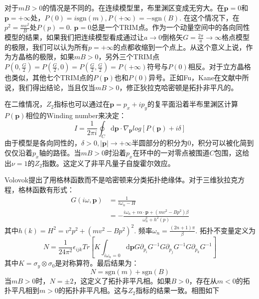 \documentclass{article}
\numberwithin{equation}{subsection}
\newcommand{\p}{\mathbf{p}}
\newcommand{\md}{\mathrm{d}}
\begin{document}
对于$mB>0$的情况是不同的。在连续模型里，布里渊区变成无穷大。在$\p=0$和$\p=+\infty$处，$P(0)=i\mathrm{sgn}(m),P(+\infty)=-\mathrm{sgn}(B)$. 在这个情况下，在$p^2=\frac{mv^2}{B}$处$P(p)=0$. $\p=0$总是一个TRIM点。作为一个动量空间中的各向同性模型的结果，如果我们把连续模型看成通过让$a\to0$倒格矢$G=\frac{2\pi}{a}\to\infty$格点模型的极限，我们可以认为所有$p=+\infty$的点都收缩到一个点上。从这个意义上说，作为方晶格的极限，如果$mB>0$，另外三个TRIM点$P(0,\frac{G}{2})=P(\frac{G}{2},0)=P(\frac{G}{2},\frac{G}{2})=P(+\infty)$符号与$P(0)$相反。对于立方晶格也类似，其他七个TRIM点的$P(\p)$也和$P(0)$异号。正如Fu，Kane在文献中所说，我们得出结论，当且仅当$mB>0$，修正狄拉克哈密顿是拓扑非平凡的。

在二维情况，$Z_2$指标也可以通过在$\p=p_x+ip_y$的复平面沿着半布里渊区计算$P(\p)$相位的Winding number来决定：
\begin{equation}
    I=\frac{1}{2\pi i}\oint_C\md\p\cdot\nabla_{\p}log[P(\p)+i\delta]
\end{equation}
由于模型是各向同性的，$\delta>0,|\p|\to+\infty$半圆部分的积分为$0$，积分可以被化简到仅仅沿着$p_x$轴的路径。当$mB>0$时沿着$p_x$在环中的一对零点被围道$C$包围，这给出$\nu=1$的$Z_2$指数。这定义了非平凡量子自旋霍尔效应。

Volovok提出了用格林函数而不是哈密顿来分类拓扑绝缘体。对于三维狄拉克方程，格林函数有形式：
\begin{equation}
    \begin{split}
        G(i\omega,\p)&=\frac{1}{i\omega_n-H}\\
        &=-\frac{i\omega_n+v\alpha\cdot\p+(mv^2-Bp^2)\beta}{\omega_n^2+h^2(p)}
    \end{split}
\end{equation}
其中$h(k)=H^2=v^2p^2+(mv^2-Bp^2)^2$. 频率$\omega_n=\frac{(2n+1)\pi}{\beta}$. 拓扑不变量定义为
\begin{equation}
    N=\frac{1}{24\pi^2}\epsilon_{ijk}Tr[K\int_{i\omega_n=0}\md\p G\partial_{p_i}G^{-1}G\partial_{p_j}G^{-1}G\partial_{p_k}G^{-1}]
\end{equation}
其中$K=\sigma_y\otimes\sigma_0$是对称算符。最后结果为：
\begin{equation}
    N=\mathrm{sgn}(m)+\mathrm{sgn}(B)
\end{equation}
当$mB>0$时，$N=\pm2$，这定义了拓扑非平凡相。如果$B>0$，存在从$m<0$的拓扑平凡相到$m>0$的拓扑非平凡相。这与$Z_2$指标的结果一致。相图如下
\begin{center}
\end{center}
\end{document}

